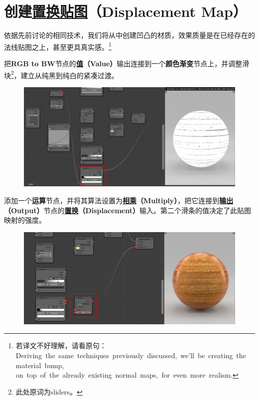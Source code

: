 \documentclass[11pt,a4paper,UTF8]{ctexart}
\begin{document}
\newpage
\section{创建\underline{置换贴图}（Displacement Map）}
依据先前讨论的相同技术，我们将从中创建凹凸的材质，效果质量是在已经存在的法线贴图之上，甚至更具真实感。\footnote{若译文不好理解，请看原句：Deriving the same techniques previously discussed, we’ll be creating the material bump,
on top of the already existing normal maps, for even more realism.}

把\textbf{RGB to BW}节点的\textbf{\underline{值}（Value）}输出连接到一个\textbf{颜色渐变}节点上，并调整滑块\footnote{此处原词为sliders。}，建立从纯黑到纯白的紧凑过渡。
\begin{figure}[hb]
    \centering
    \includegraphics[scale=0.41]{step7_1.png}
\end{figure}

添加一个\textbf{运算}节点，并将其算法设置为\textbf{\underline{相乘}（Multiply）}，把它连接到\textbf{\underline{输出}（Output）}节点的\textbf{\underline{置换}（Displacement）}输入。第二个滑条的值决定了此贴图映射的强度。

\begin{figure}[hb]
    \centering
    \includegraphics[scale=0.41]{step7_2.png}
\end{figure}
\end{document}

